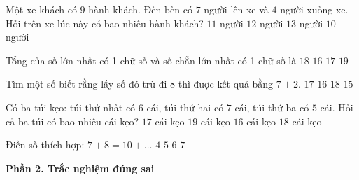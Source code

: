 \begin{ex} %
Một xe khách có $9$ hành khách. Đến bến có $7$ người lên xe và $4$ người xuống xe. Hỏi trên xe lúc này có bao nhiêu hành khách?
\choice
{$11$ người}
{\True $12$ người}
{$13$ người}
{$10$ người}
\end{ex}

\begin{ex} %
Tổng của số lớn nhất có 1 chữ số và số chẵn lớn nhất có 1 chữ số là
\choice
{$18$}
{$16$}
{\True $17$}
{$19$}
\end{ex}

\begin{ex} %
Tìm một số biết rằng lấy số đó trừ đi $8$ thì được kết quả bằng $7 + 2$.
\choice
{\True $17$}
{$16$}
{$18$}
{$15$}
\end{ex}

\begin{ex} %
Có ba túi kẹo: túi thứ nhất có $6$ cái, túi thứ hai có $7$ cái, túi thứ ba có $5$ cái. Hỏi cả ba túi có bao nhiêu cái kẹo?
\choice
{$17$ cái kẹo}
{$19$ cái kẹo}
{$16$ cái kẹo}
{\True $18$ cái kẹo}
\end{ex}

\begin{ex} %
Điền số thích hợp: $7 + 8 = 10 + \dots$
\choice
{$4$}
{\True $5$}
{$6$}
{$7$}
\end{ex}

\textbf{Phần 2. Trắc nghiệm đúng sai}


